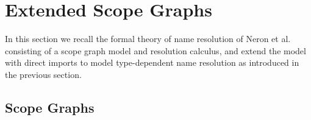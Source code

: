 \section{Extended Scope Graphs}

In this section we recall the formal theory of name resolution of Neron et al.
\cite{NeronTVW-ESOP-2015} consisting of a scope graph model and resolution
calculus, and extend the model with direct imports to model type-dependent name
resolution as introduced in the previous section. 



\subsection{Scope Graphs}

